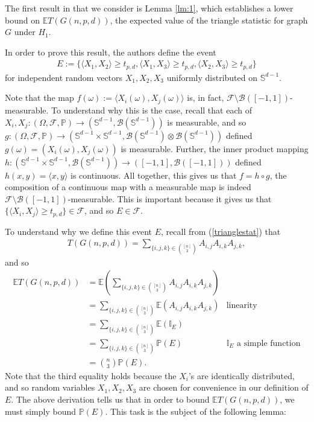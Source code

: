 \documentclass{article}
\begin{document}
The first result in \cite{bubeck2016testing} that we consider is Lemma \ref{lm:1}, which establishes a lower bound on $\mathbb{E}T(G(n,p,d))$, the expected value of the triangle statistic for graph $G$ under $H_1$. 

In order to prove this result, the authors define the event 
\begin{align*}
    E := \bigg\{ \langle X_1, X_2 \rangle \geq t_{p,d}, \langle X_1, X_3 \rangle \geq t_{p,d},  \langle X_2, X_3 \rangle \geq  t_{p,d} \bigg\}
\end{align*}
for independent random vectors $X_1, X_2, X_3$  uniformly distributed on $\mathbb{S}^{d-1}$. 

Note that the map $f(\omega) := \langle X_i(\omega), X_j(\omega) \rangle$ is, in fact, $\mathcal{F} \setminus \mathcal{B}([-1, 1])$-measurable. To understand why this is the case, recall that each of $X_i, X_j: (\Omega, \mathcal{F}, \mathbb{P}) \rightarrow (\mathbb{S}^{d-1}, \mathcal{B}(\mathbb{S}^{d-1}))$ is measurable, and so $g: (\Omega, \mathcal{F}, \mathbb{P}) \rightarrow (\mathbb{S}^{d-1} \times \mathbb{S}^{d-1}, \mathcal{B}(\mathbb{S}^{d-1}) \otimes \mathcal{B}(\mathbb{S}^{d-1}))$ defined $g(\omega) = (X_i(\omega), X_j(\omega))$ is measurable. Further, the inner product mapping $h: (\mathbb{S}^{d-1} \times \mathbb{S}^{d-1}, \mathcal{B}(\mathbb{S}^{d-1})) \rightarrow ([-1, 1], \mathcal{B}([-1, 1]))$ defined $h(x, y) = \langle x, y\rangle$ is continuous. All together, this gives us that $f = h \circ g$, the composition of a continuous map with a measurable map is indeed $\mathcal{F}\setminus \mathcal{B}([-1,1])$-measurable. This is important because it gives us that $\{ \langle X_i, X_j \rangle \geq t_{p,d} \} \in \mathcal{F}$, and so  $E \in \mathcal{F}$.

To understand why we define this event $E$, recall from (\ref{trianglestat}) that 
\begin{align*}
  T(G(n,p,d)) = \sum\limits_{\{i,j,k\} \in \binom{[n]}{3}} A_{i,j} A_{i,k} A_{j,k},  
\end{align*}
and so 
\begin{align*}
    \mathbb{E}T(G(n,p,d)) &= \mathbb{E} \left( \sum\limits_{\{i,j,k\} \in \binom{[n]}{3}} A_{i,j} A_{i,k} A_{j,k} \right)\\
    &= \sum\limits_{\{i,j,k\} \in \binom{[n]}{3}} \mathbb{E}(A_{i,j} A_{i,k} A_{j,k}) & \text{linearity}\\
    &= \sum\limits_{\{i,j,k\} \in \binom{[n]}{3}} \mathbb{E}(\mathbb{I}_{E})\\
    &= \sum\limits_{\{i,j,k\} \in \binom{[n]}{3}} \mathbb{P}(E)& \text{$\mathbb{I}_{E}$ a simple function}\\
    &= \binom{n}{3} \mathbb{P}(E).
\end{align*}
Note that the third equality holds because the $X_i$'s are identically distributed, and so random variables $X_1, X_2, X_3$ are chosen for convenience in our definition of $E$. The above derivation tells us that in order to bound $\mathbb{E}T(G(n,p,d))$, we must simply bound $\mathbb{P}(E)$. This task is the subject of the following lemma:
\end{document}
